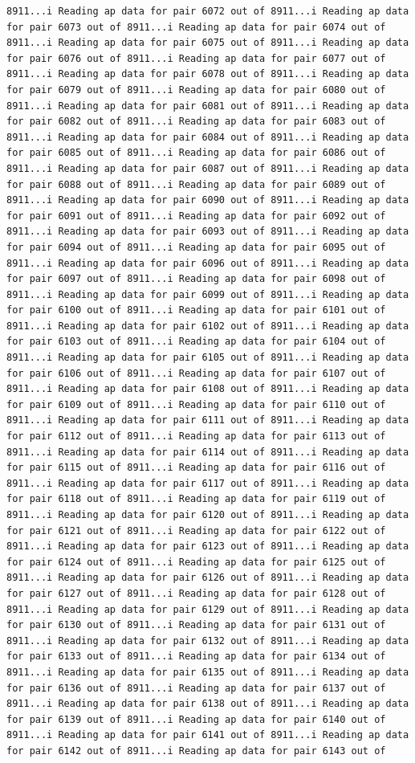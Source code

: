 \documentclass[
]{article}
\begin{document}
\begin{verbatim}
8911...i Reading ap data for pair 6072 out of 8911...i Reading ap data for pair 6073 out of 8911...i Reading ap data for pair 6074 out of 8911...i Reading ap data for pair 6075 out of 8911...i Reading ap data for pair 6076 out of 8911...i Reading ap data for pair 6077 out of 8911...i Reading ap data for pair 6078 out of 8911...i Reading ap data for pair 6079 out of 8911...i Reading ap data for pair 6080 out of 8911...i Reading ap data for pair 6081 out of 8911...i Reading ap data for pair 6082 out of 8911...i Reading ap data for pair 6083 out of 8911...i Reading ap data for pair 6084 out of 8911...i Reading ap data for pair 6085 out of 8911...i Reading ap data for pair 6086 out of 8911...i Reading ap data for pair 6087 out of 8911...i Reading ap data for pair 6088 out of 8911...i Reading ap data for pair 6089 out of 8911...i Reading ap data for pair 6090 out of 8911...i Reading ap data for pair 6091 out of 8911...i Reading ap data for pair 6092 out of 8911...i Reading ap data for pair 6093 out of 8911...i Reading ap data for pair 6094 out of 8911...i Reading ap data for pair 6095 out of 8911...i Reading ap data for pair 6096 out of 8911...i Reading ap data for pair 6097 out of 8911...i Reading ap data for pair 6098 out of 8911...i Reading ap data for pair 6099 out of 8911...i Reading ap data for pair 6100 out of 8911...i Reading ap data for pair 6101 out of 8911...i Reading ap data for pair 6102 out of 8911...i Reading ap data for pair 6103 out of 8911...i Reading ap data for pair 6104 out of 8911...i Reading ap data for pair 6105 out of 8911...i Reading ap data for pair 6106 out of 8911...i Reading ap data for pair 6107 out of 8911...i Reading ap data for pair 6108 out of 8911...i Reading ap data for pair 6109 out of 8911...i Reading ap data for pair 6110 out of 8911...i Reading ap data for pair 6111 out of 8911...i Reading ap data for pair 6112 out of 8911...i Reading ap data for pair 6113 out of 8911...i Reading ap data for pair 6114 out of 8911...i Reading ap data for pair 6115 out of 8911...i Reading ap data for pair 6116 out of 8911...i Reading ap data for pair 6117 out of 8911...i Reading ap data for pair 6118 out of 8911...i Reading ap data for pair 6119 out of 8911...i Reading ap data for pair 6120 out of 8911...i Reading ap data for pair 6121 out of 8911...i Reading ap data for pair 6122 out of 8911...i Reading ap data for pair 6123 out of 8911...i Reading ap data for pair 6124 out of 8911...i Reading ap data for pair 6125 out of 8911...i Reading ap data for pair 6126 out of 8911...i Reading ap data for pair 6127 out of 8911...i Reading ap data for pair 6128 out of 8911...i Reading ap data for pair 6129 out of 8911...i Reading ap data for pair 6130 out of 8911...i Reading ap data for pair 6131 out of 8911...i Reading ap data for pair 6132 out of 8911...i Reading ap data for pair 6133 out of 8911...i Reading ap data for pair 6134 out of 8911...i Reading ap data for pair 6135 out of 8911...i Reading ap data for pair 6136 out of 8911...i Reading ap data for pair 6137 out of 8911...i Reading ap data for pair 6138 out of 8911...i Reading ap data for pair 6139 out of 8911...i Reading ap data for pair 6140 out of 8911...i Reading ap data for pair 6141 out of 8911...i Reading ap data for pair 6142 out of 8911...i Reading ap data for pair 6143 out of 
\end{verbatim}
\end{document}
